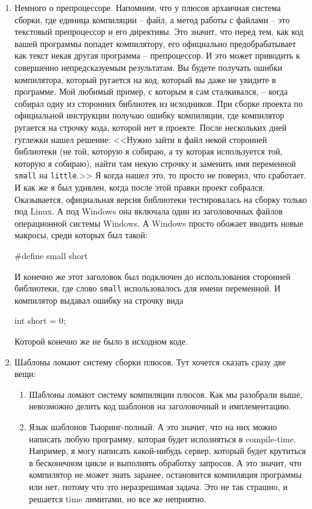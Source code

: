 \begin{enumerate}
\item %
Немного о препроцессоре.
Напомним, что у плюсов архаичная система сборки, где единица компиляции -- файл, а метод работы с файлами -- это текстовый препроцессор и его директивы.
Это значит, что перед тем, как код вашей программы попадет компилятору, его официально предобрабатывает как текст некая другая программа -- препроцессор.
И это может приводить к совершенно непредсказуемым результатам.
Вы будете получать ошибки компилятора, который ругается на код, который вы даже не увидите в программе.
Мой любимый пример, с которым я сам сталкивался, -- когда собирал одну из сторонних библиотек из исходников.
При сборке проекта по официальной инструкции получаю ошибку компиляции, где компилятор ругается на строчку кода, которой нет в проекте.
После нескольких дней гуглежки нашел решение: <<Нужно зайти в файл некой сторонней библиотеки (не той, которую я собираю, а ту которая используется той, которую я собираю), найти там некую строчку и заменить имя переменной \verb"small" на \verb"little".>> Я когда нашел это, то просто не поверил, что сработает.
И как же я был удивлен, когда после этой правки проект собрался.
Оказывается, официальная версия библиотеки тестировалась на сборку только под Linux.
А под Windows она включала один из заголовочных файлов операционной системы Windows.
А Windows просто обожает вводить новые макросы, среди которых был такой:
\begin{cppcode}[numbers=none]
#define small short
\end{cppcode}
И конечно же этот заголовок был подключен до использования сторонней библиотеки, где слово \verb"small" использовалось для имени переменной.
И компилятор выдавал ошибку на строчку вида
\begin{cppcode}[numbers=none]
int short = 0;
\end{cppcode}
Которой конечно же не было в исходном коде.

\item %
Шаблоны ломают систему сборки плюсов.
Тут хочется сказать сразу две вещи:
\begin{enumerate}
\item Шаблоны ломают систему компиляции плюсов.
Как мы разобрали выше, невозможно делить код шаблонов на заголовочный и имплементацию.

\item Язык шаблонов Тьюринг-полный.
А это значит, что на них можно написать любую программу, которая будет исполняться в compile-time.
Например, я могу написать какой-нибудь сервер, который будет крутиться в бесконечном цикле и выполнять обработку запросов.
А это значит, что компилятор не может знать заранее, остановится компиляция программы или нет, потому что это неразрешимая задача.
Это не так страшно, и решается time лимитами, но все же неприятно.
\end{enumerate}


\end{enumerate}

